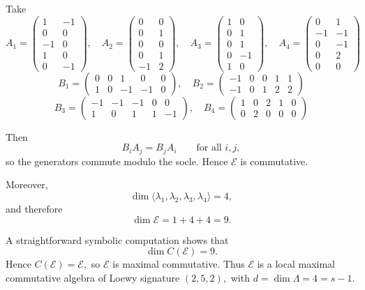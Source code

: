 \documentclass[11pt]{article}
\theoremstyle{remark}
\theoremstyle{plain}
\theoremstyle{definition}
\theoremstyle{myremark}
\begin{document}
	Take
\[ A_1= \begin{pmatrix} 1 & -1\\ 0 & 0\\ -1 & 0\\ 1 & 0\\ 0 & -1 \end{pmatrix},\quad   
   A_2= \begin{pmatrix} 0 & 0\\ 0 & 1\\ 0 & 0\\ 0 & 1\\ -1 & 2 \end{pmatrix},\quad  
   A_3= \begin{pmatrix} 1 & 0\\ 0 & 1\\ 0 & 1\\ 0 & -1\\ 1 & 0 \end{pmatrix},\quad  
   A_4= \begin{pmatrix} 0 & 1\\ -1 & -1\\ 0 & -1\\ 0 & 2\\ 0 & 0 \end{pmatrix} \] 
\[ B_1= \begin{pmatrix} 0 & 0 & 1 & 0 & 0\\ 1 & 0 & -1 & -1 & 0 \end{pmatrix} ,\quad  
   B_2= \begin{pmatrix} -1 & 0 & 0 & 1 & 1\\ -1 & 0 & 1 & 2 & 2 \end{pmatrix} \] 
\[ B_3= \begin{pmatrix} -1 & -1 & -1 & 0 & 0\\ 1 & 0 & 1 & 1 & -1 \end{pmatrix} ,\quad  
   B_4= \begin{pmatrix} 1 & 0 & 2 & 1 & 0\\ 0 & 2 & 0 & 0 & 0 \end{pmatrix} \]

Then
\[
B_iA_j=B_jA_i\qquad\text{for all }i,j,
\]
so the generators commute modulo the socle. Hence
$\mathcal{E}$
is commutative.

Moreover,
\[
\dim \langle \lambda_1,\lambda_2,\lambda_3,\lambda_4\rangle=4,
\]
and therefore
\[
\dim \mathcal E=1+4+4=9.
\]

A straightforward symbolic computation shows that
\[
\dim C(\mathcal E)=9.
\]
Hence $C(\mathcal E)=\mathcal E, $
so
$\mathcal{E}$
is maximal commutative. Thus
$\mathcal{E}$
is a local maximal commutative algebra of Loewy signature
$(2,5,2),$ with $d=\dim\Lambda=4=s-1.$
\end{document}
